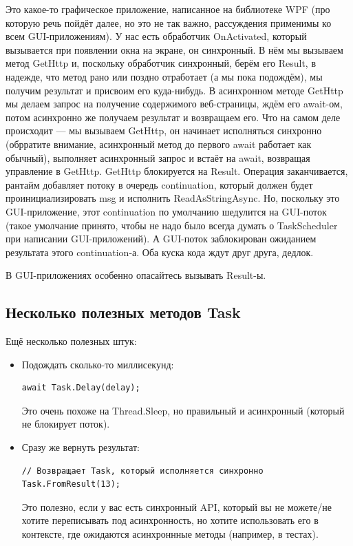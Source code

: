 \documentclass[a5paper]{article}
\begin{document}
Это какое-то графическое приложение, написанное на библиотеке WPF (про которую речь пойдёт далее, но это не так важно, рассуждения применимы ко всем GUI-приложениям). У нас есть обработчик OnActivated, который вызывается при появлении окна на экране, он синхронный. В нём мы вызываем метод GetHttp и, поскольку обработчик синхронный, берём его Result, в надежде, что метод рано или поздно отработает (а мы пока подождём), мы получим результат и присвоим его куда-нибудь. В асинхронном методе GetHttp мы делаем запрос на получение содержимого веб-страницы, ждём его await-ом, потом асинхронно же получаем результат и возвращаем его. Что на самом деле происходит --- мы вызываем GetHttp, он начинает исполняться синхронно (обрратите внимание, асинхронный метод до первого await работает как обычный), выполняет асинхронный запрос и встаёт на await, возвращая управление в GetHttp. GetHttp блокируется на Result. Операция заканчивается, рантайм добавляет потоку в очередь continuation, который должен будет проинициализировать msg и исполнить ReadAsStringAsync. Но, поскольку это GUI-приложение, этот continuation по умолчанию шедулится на GUI-поток (такое умолчание принято, чтобы не надо было всегда думать о TaskScheduler при написании GUI-приложений). А GUI-поток заблокирован ожиданием результата этого continuation-а. Оба куска кода ждут друг друга, дедлок. 

В GUI-приложениях особенно опасайтесь вызывать Result-ы.

\subsection{Несколько полезных методов Task}

Ещё несколько полезных штук:

\begin{itemize}
    \item Подождать сколько-то миллисекунд:
    \begin{verbatim}
await Task.Delay(delay);
    \end{verbatim}
    Это очень похоже на Thread.Sleep, но правильный и асинхронный (который не блокирует поток).

    \item Сразу же вернуть результат:
    \begin{verbatim}
// Возвращает Task, который исполняется синхронно
Task.FromResult(13);
    \end{verbatim}
    Это полезно, если у вас есть синхронный API, который вы не можете/не хотите переписывать под  асинхронность, но хотите использовать его в контексте, где ожидаются асинхроннные методы (например, в тестах).
\end{itemize}
\end{document}
